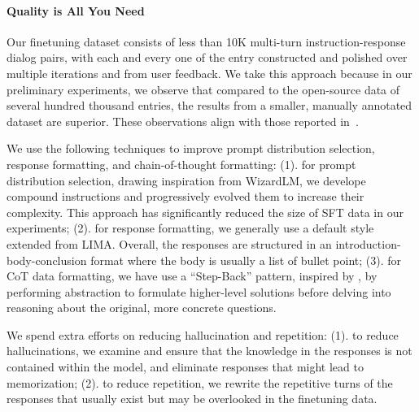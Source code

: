 \paragraph{Quality is All You Need}
Our finetuning dataset consists of less than 10K multi-turn instruction-response dialog pairs, with each and every one of the entry constructed and polished over multiple iterations and from user feedback.
We take this approach because  in our preliminary experiments, we observe that compared to the open-source data of several hundred thousand entries, the results from a smaller, manually annotated dataset are superior.
These observations align with those reported in~\citet{llama2, zhou2023lima, team2023gemini}. 

We use the following techniques to improve prompt distribution selection, response formatting, and chain-of-thought formatting:
(1). for prompt distribution selection,
drawing inspiration from WizardLM\citep{xu2023wizardlm}, we develope compound instructions and progressively evolved them to increase their complexity. 
This approach has significantly reduced the size of SFT data 
in our experiments;
(2). for response formatting, we generally use a default style extended from LIMA\cite{zhou2023lima}. Overall, the responses are structured in an introduction-body-conclusion format where the body is usually a list of bullet point;
(3). for CoT data formatting, we have use a ``Step-Back'' pattern, inspired by \citet{zheng2023step}, by performing abstraction to formulate higher-level solutions before delving into reasoning about the original, more concrete questions.

We spend extra efforts on reducing hallucination and repetition:
(1). to reduce hallucinations, 
we examine and ensure that the knowledge in the responses is not contained within the model, and eliminate responses that might lead to memorization;
(2). to reduce repetition, we rewrite the repetitive turns of the responses that usually exist but may be overlooked in the finetuning data. 

